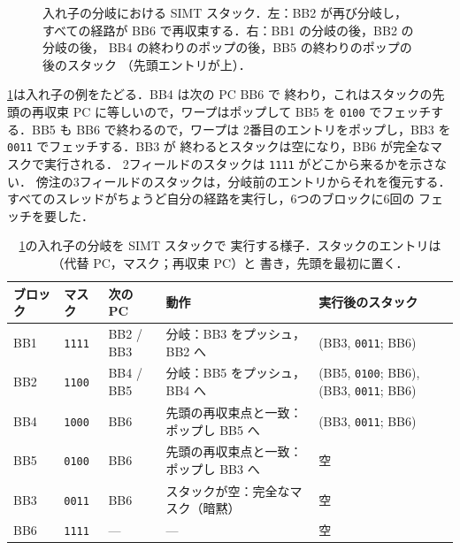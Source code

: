 \documentclass[../main.tex]{subfiles}
\begin{document}
\begin{figure}[tb]
  \centering
  
  \caption{入れ子の分岐における SIMT スタック．左：BB2 が再び分岐し，
    すべての経路が BB6 で再収束する．右：BB1 の分岐の後，BB2 の分岐の後，
    BB4 の終わりのポップの後，BB5 の終わりのポップの後のスタック
    （先頭エントリが上）．}
  \label{fig:l06-simt-stack}
\end{figure}

\cref{tab:l06-simt-trace}は入れ子の例をたどる．BB4 は次の PC BB6 で
終わり，これはスタックの先頭の再収束 PC に等しいので，ワープはポップして
BB5 を \texttt{0100} でフェッチする．BB5 も BB6 で終わるので，ワープは
2番目のエントリをポップし，BB3 を \texttt{0011} でフェッチする．BB3 が
終わるとスタックは空になり，BB6 が完全なマスクで実行される．
2フィールドのスタックは \texttt{1111} がどこから来るかを示さない．
傍注の3フィールドのスタックは，分岐前のエントリからそれを復元する．
すべてのスレッドがちょうど自分の経路を実行し，6つのブロックに6回の
フェッチを要した．

\begin{table}[tb]
  \centering
  \caption{\cref{fig:l06-simt-stack}の入れ子の分岐を SIMT スタックで
    実行する様子．スタックのエントリは（代替 PC，マスク；再収束 PC）と
    書き，先頭を最初に置く．}
  \label{tab:l06-simt-trace}
  \setlength{\tabcolsep}{4pt}
  \begin{tabular}{@{}l l l >{\raggedright\arraybackslash}p{34mm} >{\raggedright\arraybackslash}p{33mm}@{}}
    \toprule
    ブロック & マスク & 次の PC & 動作 & 実行後のスタック \\
    \midrule
    BB1 & \texttt{1111} & BB2 / BB3 & 分岐：BB3 をプッシュ，BB2 へ
      & (BB3, \texttt{0011}; BB6) \\
    BB2 & \texttt{1100} & BB4 / BB5 & 分岐：BB5 をプッシュ，BB4 へ
      & (BB5, \texttt{0100}; BB6), (BB3, \texttt{0011}; BB6) \\
    BB4 & \texttt{1000} & BB6 & 先頭の再収束点と一致：ポップし BB5 へ
      & (BB3, \texttt{0011}; BB6) \\
    BB5 & \texttt{0100} & BB6 & 先頭の再収束点と一致：ポップし BB3 へ
      & 空 \\
    BB3 & \texttt{0011} & BB6 & スタックが空：完全なマスク（暗黙） & 空 \\
    BB6 & \texttt{1111} & --- & --- & 空 \\
    \bottomrule
  \end{tabular}
\end{table}
\end{document}

